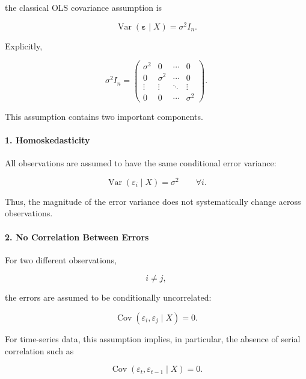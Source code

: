 the classical OLS covariance assumption is

\[
\boxed{
\operatorname{Var}
\left(
\boldsymbol{\varepsilon}\mid X
\right)
=
\sigma^2 I_n.
}
\]

Explicitly,

\[
\sigma^2 I_n
=
\begin{pmatrix}
\sigma^2 & 0 & \cdots & 0\\
0 & \sigma^2 & \cdots & 0\\
\vdots & \vdots & \ddots & \vdots\\
0 & 0 & \cdots & \sigma^2
\end{pmatrix}.
\]

This assumption contains two important components.



\paragraph{1. Homoskedasticity}

All observations are assumed to have the same conditional error variance:

\[
\boxed{
\operatorname{Var}
\left(
\varepsilon_i\mid X
\right)
=
\sigma^2
\qquad
\forall i.
}
\]

Thus, the magnitude of the error variance does not systematically change
across observations.



\paragraph{2. No Correlation Between Errors}

For two different observations,

\[
i\neq j,
\]

the errors are assumed to be conditionally uncorrelated:

\[
\boxed{
\operatorname{Cov}
\left(
\varepsilon_i,\varepsilon_j\mid X
\right)
=
0.
}
\]

For time-series data, this assumption implies, in particular, the absence of
serial correlation such as

\[
\operatorname{Cov}
\left(
\varepsilon_t,\varepsilon_{t-1}\mid X
\right)
=
0.
\]

